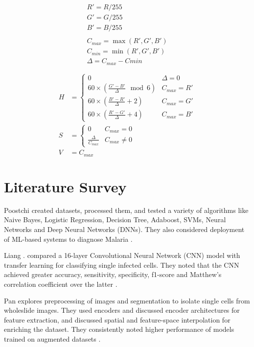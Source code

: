 \documentclass[10pt,twocolumn,letterpaper]{article}
\begin{document}
\begin{gather*}
   R' = R / 255\\
   G' = G / 255\\
   B' = B/255\\\\
C_{max} = \max(R', G', B')\\
C_{min} = \min(R', G', B')\\
\Delta = C_{max} - C{min} \\\\
\end{gather*}
\begin{align}
   H &= \begin{cases}
      0 & \Delta = 0\\
      60 \times (\frac{G' - B'}{\Delta}\mod{6}) & C_{max} = R'\\
      60 \times (\frac{B' - R'}{\Delta}+2) & C_{max} = G'\\
      60 \times (\frac{R' - G'}{\Delta} + 4)& C_{max} = B'
   \end{cases}\\
   S &= \begin{cases}
      0 & C_{max} = 0\\
      \frac{\Delta}{C_{max}} & C_{max} \neq 0
   \end{cases}\\
   V &= C_{max}
\end{align}

\section{Literature Survey}
%
Poostchi \etal created datasets, processed them, and tested a variety of algorithms like Naive Bayes, Logistic Regression, Decision Tree, Adaboost, SVMs, Neural Networks and Deep Neural Networks (DNNs). They also considered deployment of ML-based systems to diagnose Malaria \cite{POOSTCHI201836}.

Liang \etal. compared a 16-layer Convolutional Neural Network (CNN) model with transfer learning for classifying single infected cells. They noted that the CNN achieved greater accuracy, sensitivity, specificity, f1-score and Matthew's correlation coefficient over the latter \cite{7822567}.

Pan \etal explores preprocessing of images and segmentation to isolate single cells from wholeslide images. They used encoders and discussed encoder architectures for feature extraction, and discussed spatial and feature-space interpolation for enriching the dataset. They consistently noted higher performance of models trained on augmented datasets \cite{Pan18}.
\end{document}
